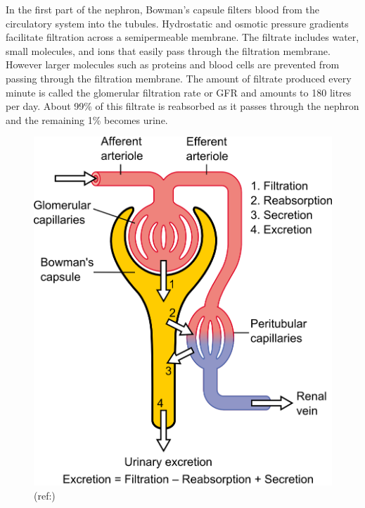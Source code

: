 In the first part of the nephron, Bowman's capsule filters blood from the circulatory system into the tubules. Hydrostatic and osmotic pressure gradients facilitate filtration across a semipermeable membrane. The filtrate includes water, small molecules, and ions that easily pass through the filtration membrane. However larger molecules such as proteins and blood cells are prevented from passing through the filtration membrane. The amount of filtrate produced every minute is called the glomerular filtration rate or GFR and amounts to 180 litres per day. About 99\% of this filtrate is reabsorbed as it passes through the nephron and the remaining 1\% becomes urine.



\begin{figure}

{\centering \includegraphics[width=0.7\linewidth]{./figures/excretory/Physiology_of_Nephron} 

}

\caption{(ref:)}\label{fig:unnamed-chunk-1}
\end{figure}




